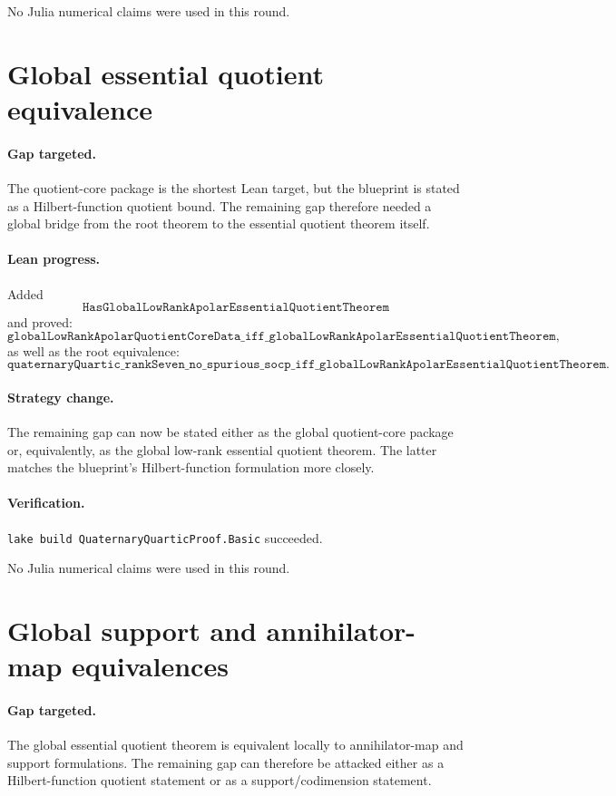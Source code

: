 \documentclass[11pt]{article}
\begin{document}
No Julia numerical claims were used in this round.

\section*{Global essential quotient equivalence}

\paragraph{Gap targeted.}
The quotient-core package is the shortest Lean target, but the blueprint is
stated as a Hilbert-function quotient bound.  The remaining gap therefore
needed a global bridge from the root theorem to the essential quotient theorem
itself.

\paragraph{Lean progress.}
Added
\[
\texttt{HasGlobalLowRankApolarEssentialQuotientTheorem}
\]
and proved:
\[
\texttt{globalLowRankApolarQuotientCoreData\_iff\_globalLowRankApolarEssentialQuotientTheorem},
\]
as well as the root equivalence:
\[
\texttt{quaternaryQuartic\_rankSeven\_no\_spurious\_socp\_iff\_globalLowRankApolarEssentialQuotientTheorem}.
\]

\paragraph{Strategy change.}
The remaining gap can now be stated either as the global quotient-core package
or, equivalently, as the global low-rank essential quotient theorem.  The
latter matches the blueprint's Hilbert-function formulation more closely.

\paragraph{Verification.}
\texttt{lake build QuaternaryQuarticProof.Basic} succeeded.

No Julia numerical claims were used in this round.

\section*{Global support and annihilator-map equivalences}

\paragraph{Gap targeted.}
The global essential quotient theorem is equivalent locally to annihilator-map
and support formulations.  The remaining gap can therefore be attacked either
as a Hilbert-function quotient statement or as a support/codimension statement.
\end{document}
